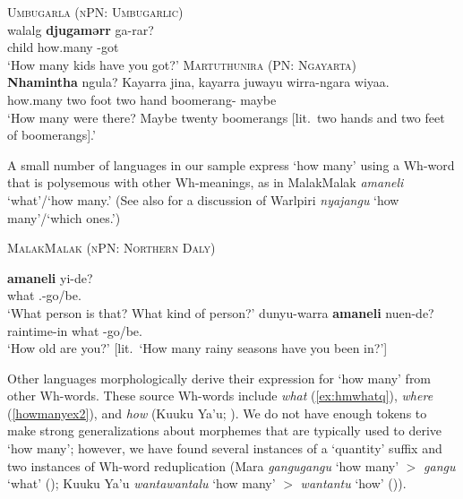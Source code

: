 \documentclass[12pt,egregdoesnotlikesansseriftitles]{scrartcl}
\begin{document}
\begin{exe}
  \ex\label{ex:npnhm}\textsc{Umbugarla (nPN: Umbugarlic)}\hfill {}\\
  \gll walalg \textbf{djugamərr} ga-rar?\\
  child how.many \Ssg-got\\
  \glt `How many kids have you got?'
  \ex\label{ex:pnhm}\textsc{Martuthunira (PN: Ngayarta)}\hfill {}\\
  \gll \textbf{Nhamintha} ngula? Kayarra jina, kayarra juwayu wirra-ngara wiyaa.\\
  how.many \Ignor{} two foot two hand boomerang-\Pl{} maybe\\
  \glt `How many were there? Maybe twenty boomerangs [lit.\ two hands and two feet of boomerangs].'
\end{exe}

A small number of languages in our sample express `how many' using a Wh-word that is polysemous with other Wh-meanings, as in MalakMalak \textit{amaneli} `what'/`how many.' (See also  \citealt[15-16]{bittnerhale95} for a discussion of Warlpiri \textit{nyajangu} `how many'/`which ones.')

\begin{exe}
  \ex\label{ex:whathm}\textsc{MalakMalak (nPN: Northern Daly)}\hfill {}
  \begin{xlist}
    \ex\gll \textbf{amaneli} yi-de?\\
    what \Tsg.\M-go/be.\Prs\\
    \glt `What person is that? What kind of person?'
    \ex\gll dunyu-warra \textbf{amaneli} nuen-de?\\
    raintime-in what \Ssg-go/be.\Prs\\
    \glt `How old are you?' [lit.\ `How many rainy seasons have you been in?']
    
    
  \end{xlist}
 \end{exe}
 
 
 Other languages morphologically derive their expression for `how many' from other Wh-words. These source Wh-words include \textit{what} (\ref{ex:hmwhatq}), \textit{where} (\ref{howmanyex2}), and \textit{how} (Kuuku Ya'u; \citealt{thompson88}). We do not have enough tokens to make strong generalizations about morphemes that are typically used to derive `how many'; however, we have found several instances of a `quantity' suffix and two instances of Wh-word reduplication (Mara \textit{gangugangu} `how many' $>$ \textit{gangu} `what' (\citealt[174]{heath81}); Kuuku Ya'u  \textit{wantawantalu} `how many' $>$ \textit{wantantu} `how' (\citealt[91]{thompson88})).
\end{document}
